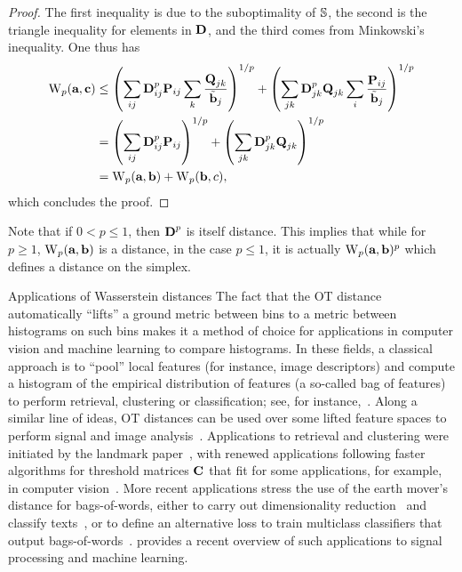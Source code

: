 \begin{proof}
The first inequality is due to the suboptimality of $\mathbb{S}$, the second is the triangle inequality for elements in $\mathrm{\textbf{D}}$, and the third comes from Minkowski's inequality. One thus has
\begin{align*}
\operatorname{\mathrm{W}}_p(\mathrm{\textbf{a}},\mathrm{\textbf{c}})& \leq \left(\sum_{ij} \mathrm{\textbf{D}}^p_{ij}\mathrm{\textbf{P}}_{ij} \sum_k \frac{\mathrm{\textbf{Q}}_{jk}}{\tilde{\mathrm{\textbf{b}}}_j}\right)^{1/p} + \left(\sum_{jk} \mathrm{\textbf{D}}^p_{jk} \mathrm{\textbf{Q}}_{jk} \sum_i \frac{\mathrm{\textbf{P}}_{ij}}{\tilde{\mathrm{\textbf{b}}}_j}\right)^{1/p}\\
&= \left(\sum_{ij} \mathrm{\textbf{D}}^p_{ij}\mathrm{\textbf{P}}_{ij}\right)^{1/p} + \left(\sum_{jk} \mathrm{\textbf{D}}^p_{jk} \mathrm{\textbf{Q}}_{jk}\right)^{1/p}\\
&= \operatorname{\mathrm{W}}_p(\mathrm{\textbf{a}},\mathrm{\textbf{b}}) +\operatorname{\mathrm{W}}_p(\mathrm{\textbf{b}},c),
\end{align*}
which concludes the proof.
\end{proof}


\begin{rem}
Note that if $0 < p \leq 1$, then $\mathrm{\textbf{D}}^p$ is itself distance. This implies that while for $p\geq 1$, $\operatorname{\mathrm{W}}_p(\mathrm{\textbf{a}},\mathrm{\textbf{b}})$ is a distance, in the case $p \leq 1$, it is actually $\operatorname{\mathrm{W}}_p(\mathrm{\textbf{a}},\mathrm{\textbf{b}})^p$ which defines a distance on the simplex.
\end{rem}


\begin{rem1}{Applications of Wasserstein distances}
The fact that the OT distance automatically ``lifts'' a ground metric between bins to a metric between histograms on such bins makes it a method of choice for applications in computer vision and machine learning to compare histograms.
%
In these fields, a classical approach is to ``pool'' local features (for instance, image descriptors) and compute a histogram of the empirical distribution of features (a so-called bag of features) to perform retrieval, clustering or classification; see, for instance,~\citep{oliva2001modeling}.
%
Along a similar line of ideas, OT distances can be used over some lifted feature spaces to perform signal and image analysis~\citep{thorpe2017transportation}.
%
Applications to retrieval and clustering were initiated by the landmark paper~\citep{RubTomGui00}, with renewed applications following faster algorithms for threshold matrices $\mathrm{\textbf{C}}$ that fit for some applications, for example, in computer vision~\citep{pele2008linear,Pele-iccv2009}.
%
More recent applications stress the use of the earth mover's distance for bags-of-words, either to carry out dimensionality reduction~\citep{pmlr-v51-rolet16} and classify texts~\citep{kusner2015word,huang2016supervised}, or to define an alternative loss to train multiclass classifiers that output bags-of-words~\citep{FrognerNIPS}.
%
\citet{kolouri2017optimal} provides a recent overview of such applications to signal processing and machine learning.
\end{rem1}





